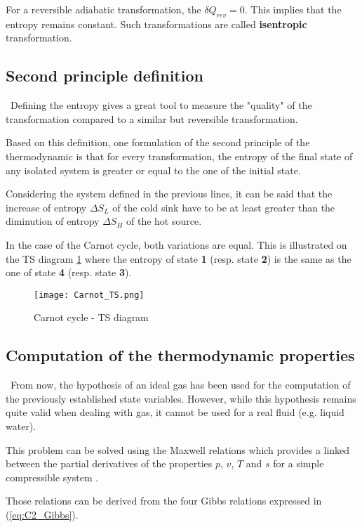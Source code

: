For a reversible adiabatic transformation, the $\delta Q_{rev}=0$. This implies that the entropy remains constant. Such transformations are called \textbf{isentropic} transformation.

\subsection{Second principle definition}
\quad\, Defining the entropy gives a great tool to measure the "quality" of the transformation compared to a similar but reversible transformation.

Based on this definition, one formulation of the second principle of the thermodynamic is that for every transformation, the entropy of the final state of any isolated system is greater or equal to the one of the initial state.

Considering the system defined in the previous lines, it can be said that the increase of entropy $\Delta S_L$ of the cold sink have to be at least greater than the diminution of entropy $\Delta S_H$ of the hot source.

In the case of the Carnot cycle, both variations are equal. This is illustrated on the TS diagram \ref{fig:C2_CarnotTS} where the entropy of state \textbf{1} (resp. state \textbf{2}) is the same as the one of state \textbf{4} (resp. state \textbf{3}).
\begin{figure}[h]
\centering
\texttt{[image: Carnot\_TS.png]}
\caption{Carnot cycle - TS diagram \cite{2015}}
\label{fig:C2_CarnotTS}
\end{figure}


\subsection{Computation of the thermodynamic properties}
\quad\, From now, the hypothesis of an ideal gas has been used for the computation of the previously established state variables. However, while this hypothesis remains quite valid when dealing with gas, it cannot be used for a real fluid (e.g. liquid water).

This problem can be solved using the Maxwell relations which provides a linked between the partial derivatives of the properties $p$, $v$, $T$ and $s$ for a simple compressible system \cite{2015}. 

Those relations can be derived from the four Gibbs relations expressed in (\ref{eq:C2_Gibbs}).

